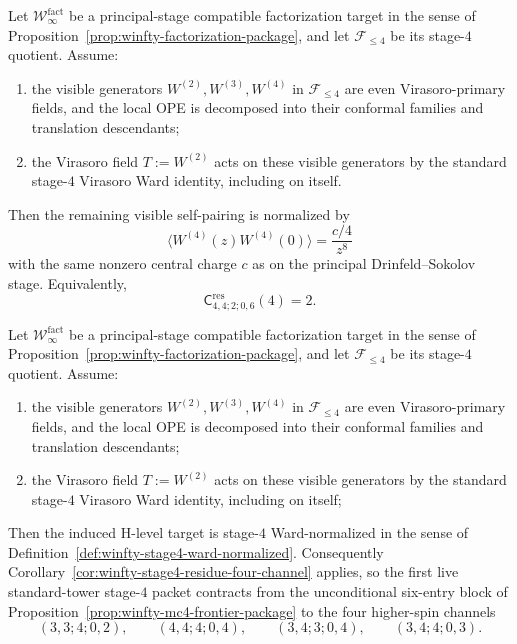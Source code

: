 \begin{conjecture}
\label{conj:winfty-stage4-visible-diagonal-normalization}
\ClaimStatusConjectured{}
Let $\mathcal{W}^{\mathrm{fact}}_\infty$ be a principal-stage
compatible factorization target in the sense of
Proposition~\ref{prop:winfty-factorization-package}, and let
$\mathcal{F}_{\le 4}$ be its stage-$4$ quotient.  Assume:
\begin{enumerate}[label=\textup{(\roman*)}]
\item the visible generators $W^{(2)},W^{(3)},W^{(4)}$ in
  $\mathcal{F}_{\le 4}$ are even Virasoro-primary fields, and the local
  OPE is decomposed into their conformal families and translation
  descendants;
\item the Virasoro field $T:=W^{(2)}$ acts on these visible generators
  by the standard stage-$4$ Virasoro Ward identity, including on
  itself.
\end{enumerate}
Then the remaining visible self-pairing is normalized by
\[
\langle W^{(4)}(z)W^{(4)}(0)\rangle = \frac{c/4}{z^{8}}
\]
with the same nonzero central charge $c$ as on the principal
Drinfeld--Sokolov stage.  Equivalently,
\[
\mathsf{C}^{\mathrm{res}}_{4,4;2;0,6}(4)=2.
\]
\end{conjecture}

\begin{conjecture}
\label{conj:winfty-stage4-ward-inheritance}
\ClaimStatusConjectured{}
Let $\mathcal{W}^{\mathrm{fact}}_\infty$ be a principal-stage
compatible factorization target in the sense of
Proposition~\ref{prop:winfty-factorization-package}, and let
$\mathcal{F}_{\le 4}$ be its stage-$4$ quotient.  Assume:
\begin{enumerate}[label=\textup{(\roman*)}]
\item the visible generators $W^{(2)},W^{(3)},W^{(4)}$ in
  $\mathcal{F}_{\le 4}$ are even Virasoro-primary fields, and the local
  OPE is decomposed into their conformal families and translation
  descendants;
\item the Virasoro field $T:=W^{(2)}$ acts on these visible generators
  by the standard stage-$4$ Virasoro Ward identity, including on
  itself;
\end{enumerate}
Then the induced H-level target is stage-$4$ Ward-normalized in the
sense of Definition~\ref{def:winfty-stage4-ward-normalized}.  Consequently
Corollary~\ref{cor:winfty-stage4-residue-four-channel} applies, so the
first live standard-tower stage-$4$ packet contracts from the
unconditional six-entry block of
Proposition~\ref{prop:winfty-mc4-frontier-package} to the four
higher-spin channels
\[
(3,3;4;0,2),\qquad
(4,4;4;0,4),\qquad
(3,4;3;0,4),\qquad
(3,4;4;0,3).
\]
\end{conjecture}

